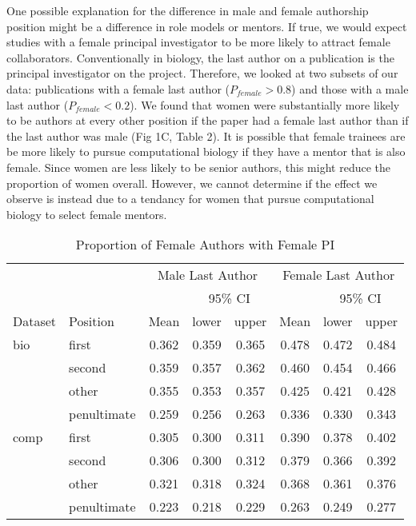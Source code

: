 \documentclass[10pt,letterpaper]{article}
\begin{document}
\begin{flushleft}
One possible explanation for the difference in male and female authorship position might be a difference in role models or mentors. If true, we would expect studies with a female principal investigator to be more likely to attract female collaborators. Conventionally in biology,  the last author on a publication is the principal investigator on the project. Therefore, we looked at two subsets of our data: publications with a female last author ($P_{female} > 0.8$) and those with a male last author ($P_{female} < 0.2$). We found that women were substantially more likely to be authors at every other position if the paper had a female last author than if the last author was male (Fig 1C, Table 2). It is possible that female trainees are be more likely to pursue computational biology if they have a mentor that is also female. Since women are less likely to be senior authors, this might reduce the proportion of women overall. However, we cannot determine if the effect we observe is instead due to a tendancy for women that pursue computational biology to select female mentors.

\begin{table}[]
\centering
\caption{Proportion of Female Authors with Female PI}
\label{Table 2}
\begin{tabular}{llcccccc}
\toprule
        &                 & \multicolumn{3}{c}{Male Last Author} & \multicolumn{3}{c}{Female Last Author} \\
\cmidrule(r){3-8}
        &                 &       & \multicolumn{2}{c}{95\% CI}  &        & \multicolumn{2}{c}{95\% CI}   \\
\cmidrule(r){4-5}\cmidrule(r){7-8}
Dataset & Position        & Mean  & lower        & upper         & Mean   & lower        & upper          \\
\midrule
bio     & first           & 0.362 & 0.359        & 0.365          & 0.478 & 0.472        & 0.484          \\
        & second          & 0.359 & 0.357        & 0.362          & 0.460 & 0.454        & 0.466          \\
        & other           & 0.355 & 0.353        & 0.357          & 0.425 & 0.421        & 0.428          \\
        & penultimate     & 0.259 & 0.256        & 0.263          & 0.336 & 0.330        & 0.343          \\
comp    & first           & 0.305 & 0.300        & 0.311          & 0.390 & 0.378        & 0.402          \\
        & second          & 0.306 & 0.300        & 0.312          & 0.379 & 0.366        & 0.392          \\
        & other           & 0.321 & 0.318        & 0.324          & 0.368 & 0.361        & 0.376          \\
        & penultimate     & 0.223 & 0.218        & 0.229          & 0.263 & 0.249        & 0.277          \\
\bottomrule
\end{tabular}
\end{table}


\end{flushleft}
\end{document}
